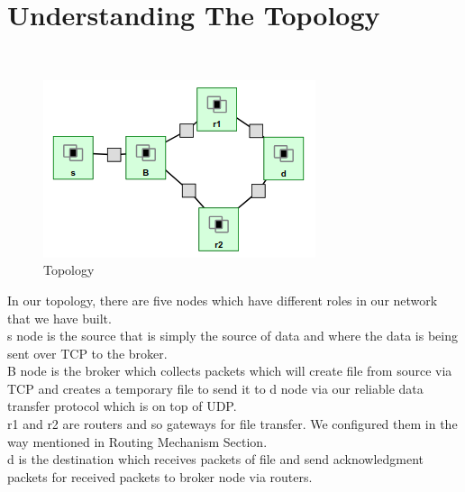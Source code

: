 \documentclass[conference]{IEEEtran}
\begin{document}
\section{Understanding The Topology}\\
\begin{figure}[ht]
  \includegraphics[width=\linewidth]{topology.png}
  \caption{Topology}
  \label{fig:boat1}
\end{figure}
In our topology, there are five nodes which have different roles in our network that we have built.\\
s node is the source that is simply the source of data and where the data is being sent over TCP to the broker.\\
B node is the broker which collects packets which will create file from source via TCP and creates a temporary file to send it to d node via our reliable data transfer protocol which is on top of UDP.\\
r1 and r2 are routers and so gateways for file transfer. We configured them in the way mentioned in Routing Mechanism Section.\\
d is the destination which receives packets of file and send acknowledgment packets for received packets to broker node via routers.\\
\end{document}
